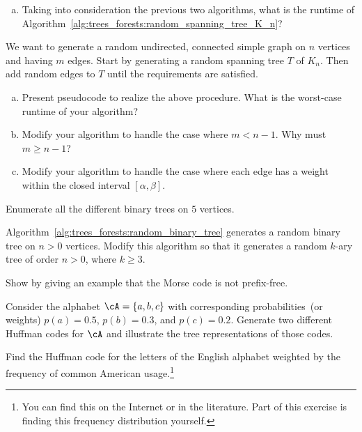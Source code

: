 \begin{problem}
\begin{enumerate}[(a)]
  \item Taking into consideration the previous two algorithms, what is
    the runtime of
    Algorithm~\ref{alg:trees_forests:random_spanning_tree_K_n}?
  \end{enumerate}

\item We want to generate a random undirected,
  connected simple graph on $n$ vertices and
  having $m$ edges. Start by generating a random
  spanning tree $T$ of
  $K_n$. Then add random edges to $T$ until the
  requirements are satisfied.
  \begin{enumerate}[(a)]
  \item Present pseudocode to realize the above procedure. What is the
    worst-case runtime of your algorithm?

  \item Modify your algorithm to handle the case where $m < n-1$. Why
    must $m \geq n-1$?

  \item Modify your algorithm to handle the case where each edge has a
    weight within the closed interval $[\alpha, \beta]$.
  \end{enumerate}

\item Enumerate all the different binary trees on
  $5$ vertices.

\item Algorithm~\ref{alg:trees_forests:random_binary_tree} generates a
  random binary tree
  on $n > 0$ vertices. Modify this algorithm so that it generates a
  random $k$-ary tree of order $n > 0$, where $k \geq 3$.

\item Show by giving an example that the Morse code
  is not prefix-free.

\item Consider the alphabet $\cA = \{a,b,c\}$ with corresponding
  probabilities~(or weights) $p(a) = 0.5$, $p(b) = 0.3$, and
  $p(c) = 0.2$. Generate two different Huffman
  codes for $\cA$ and illustrate the tree representations of those
  codes.

\item Find the Huffman code for the letters of the
  English alphabet weighted by the frequency
  of common American usage.\footnote{
    You can find this on the Internet or in the literature. Part of
    this exercise is finding this frequency distribution yourself.
  }


\end{problem}
